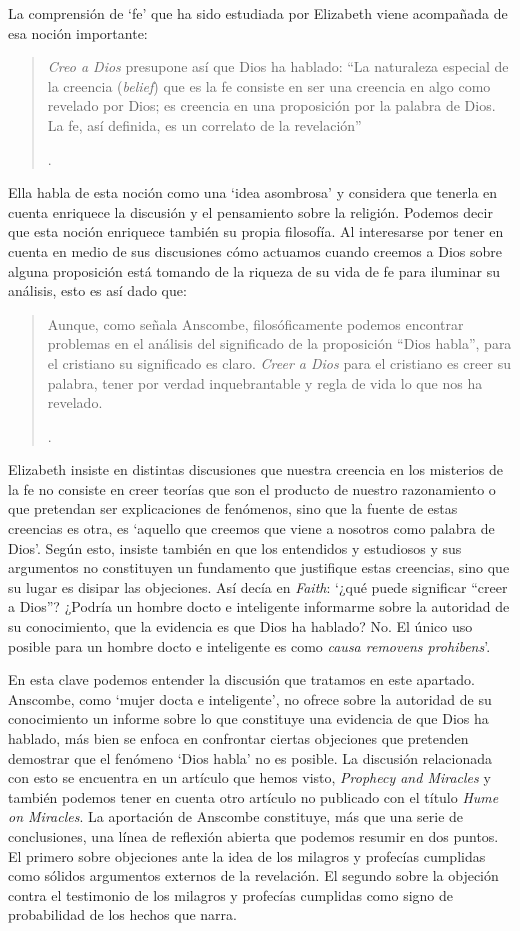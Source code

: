 \label{subsec:fecorrel}
La comprensión de `fe' que ha sido estudiada por Elizabeth viene acompañada de esa noción importante: \blockquote[{\Cite[185]{conesa1994cc}}.]{\emph{Creo a Dios} presupone así que Dios ha hablado: \enquote{La naturaleza especial de la creencia (\emph{belief}) que es la fe consiste en ser una creencia en algo como revelado por Dios; es creencia en una proposición por la palabra de Dios. La fe, así definida, es un correlato de la revelación}}. Ella habla de esta noción como una `idea asombrosa' y considera que tenerla en cuenta enriquece la discusión y el pensamiento sobre la religión. Podemos decir que esta noción enriquece también su propia filosofía. Al interesarse por tener en cuenta en medio de sus discusiones cómo actuamos cuando creemos a Dios sobre alguna proposición está tomando de la riqueza de su vida de fe para iluminar su análisis, esto es así dado que: \blockquote[{\Cite[185]{conesa1994cc}}.]{Aunque, como señala Anscombe, filosóficamente podemos encontrar problemas en el análisis del significado de la proposición \enquote{Dios habla}, para el cristiano su significado es claro. \emph{Creer a Dios} para el cristiano es creer su palabra, tener por verdad inquebrantable y regla de vida lo que nos ha revelado.} Elizabeth insiste en distintas discusiones que nuestra creencia en los misterios de la fe no consiste en creer teorías que son el producto de nuestro razonamiento o que pretendan ser explicaciones de fenómenos, sino que la fuente de estas creencias es otra, es \enquote*{aquello que creemos que viene a nosotros como palabra de Dios}. Según esto, insiste también en que los entendidos y estudiosos y sus argumentos no constituyen un fundamento que justifique estas creencias, sino que su lugar es disipar las objeciones. Así decía en \emph{Faith}: \enquote*{¿qué puede significar ``creer a Dios''? ¿Podría un hombre docto e inteligente informarme sobre la autoridad de su conocimiento, que la evidencia es que Dios ha hablado? No. El único uso posible para un hombre docto e inteligente es como \emph{causa removens prohibens}}.

En esta clave podemos entender la discusión que tratamos en este apartado. Anscombe, como `mujer docta e inteligente', no ofrece sobre la autoridad de su conocimiento un informe sobre lo que constituye una evidencia de que Dios ha hablado, más bien se enfoca en confrontar ciertas objeciones que pretenden demostrar que el fenómeno `Dios habla' no es posible. La discusión relacionada con esto se encuentra en un artículo que hemos visto, \emph{Prophecy and Miracles} y también podemos tener en cuenta otro artículo no publicado con el título \emph{Hume on Miracles}. La aportación de Anscombe constituye, más que una serie de conclusiones, una línea de reflexión abierta que podemos resumir en dos puntos. El primero sobre objeciones ante la idea de los milagros y profecías cumplidas como sólidos argumentos externos de la revelación. El segundo sobre la objeción contra el testimonio de los milagros y profecías cumplidas como signo de probabilidad de los hechos que narra.


